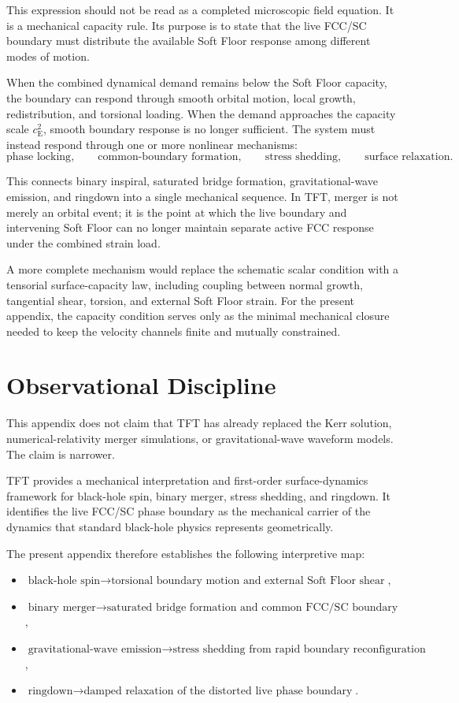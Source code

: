 This expression should not be read as a completed microscopic field equation. It is a mechanical capacity rule. Its purpose is to state that the live FCC/SC boundary must distribute the available Soft Floor response among different modes of motion.

When the combined dynamical demand remains below the Soft Floor capacity, the boundary can respond through smooth orbital motion, local growth, redistribution, and torsional loading. When the demand approaches the capacity scale $c_{\mathrm{E}}^2$, smooth boundary response is no longer sufficient. The system must instead respond through one or more nonlinear mechanisms:
\begin{equation}
    \text{phase locking}, \qquad \text{common-boundary formation}, \qquad \text{stress shedding}, \qquad \text{surface relaxation}.
\end{equation}

This connects binary inspiral, saturated bridge formation, gravitational-wave emission, and ringdown into a single mechanical sequence. In TFT, merger is not merely an orbital event; it is the point at which the live boundary and intervening Soft Floor can no longer maintain separate active FCC response under the combined strain load.

A more complete mechanism would replace the schematic scalar condition with a tensorial surface-capacity law, including coupling between normal growth, tangential shear, torsion, and external Soft Floor strain. For the present appendix, the capacity condition serves only as the minimal mechanical closure needed to keep the velocity channels finite and mutually constrained.

\section{Observational Discipline}

This appendix does not claim that TFT has already replaced the Kerr solution, numerical-relativity merger simulations, or gravitational-wave waveform models. The claim is narrower.

TFT provides a mechanical interpretation and first-order surface-dynamics framework for black-hole spin, binary merger, stress shedding, and ringdown. It identifies the live FCC/SC phase boundary as the mechanical carrier of the dynamics that standard black-hole physics represents geometrically.

The present appendix therefore establishes the following interpretive map:
\begin{itemize}
    \item $\text{black-hole spin} \rightarrow \text{torsional boundary motion and external Soft Floor shear}$,
    \item $\text{binary merger} \rightarrow \text{saturated bridge formation and common FCC/SC boundary}$,
    \item $\text{gravitational-wave emission} \rightarrow \text{stress shedding from rapid boundary reconfiguration}$,
    \item $\text{ringdown} \rightarrow \text{damped relaxation of the distorted live phase boundary}$.
\end{itemize}

